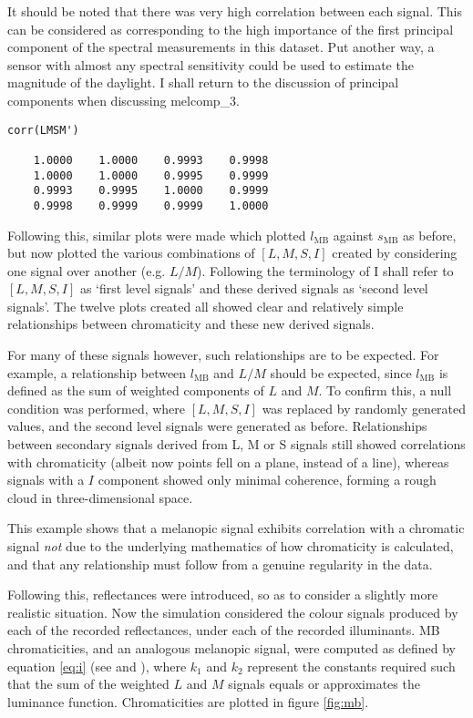 \documentclass{article}
\begin{document}
It should be noted that there was very high correlation between each signal. This can be considered as corresponding to the high importance of the first principal component of the spectral measurements in this dataset. Put another way, a sensor with almost any spectral sensitivity could be used to estimate the magnitude of the daylight. I shall return to the discussion of principal components when discussing melcomp\_3.

\begin{minipage}{\linewidth}
\begin{lstlisting}
corr(LMSM')

    1.0000    1.0000    0.9993    0.9998
    1.0000    1.0000    0.9995    0.9999
    0.9993    0.9995    1.0000    0.9999
    0.9998    0.9999    0.9999    1.0000
\end{lstlisting}
\end{minipage}

Following this, similar plots were made which plotted $l_{\text{MB}}$ against $s_{\text{MB}}$ as before, but now plotted the various combinations of $[L,M,S,I]$ created by considering one signal over another (e.g. $L/M$). Following the terminology of \cite{barrionuevo_contributions_2014} I shall refer to $[L,M,S,I]$ as `first level signals' and these derived signals as `second level signals'. The twelve plots created all showed clear and relatively simple relationships between chromaticity and these new derived signals.

For many of these signals however, such relationships are to be expected. For example, a relationship between $l_{\text{MB}}$ and $L/M$ should be expected, since $l_{\text{MB}}$ is defined as the sum of weighted components of $L$ and $M$. To confirm this, a null condition was performed, where $[L,M,S,I]$ was replaced by randomly generated values, and the second level signals were generated as before. Relationships between secondary signals derived from L, M or S signals still showed correlations with chromaticity (albeit now points fell on a plane, instead of a line), whereas signals with a $I$ component showed only minimal coherence, forming a rough cloud in three-dimensional space. 

This example shows that a melanopic signal exhibits correlation with a chromatic signal \emph{not} due to the underlying mathematics of how chromaticity is calculated, and that any relationship must follow from a genuine regularity in the data.

Following this, reflectances were introduced, so as to consider a slightly more realistic situation. Now the simulation considered the colour signals produced by each of the recorded reflectances, under each of the recorded illuminants. \ac{MB} chromaticities, and an analogous melanopic signal, were computed as defined by equation \ref{eq:i} (see \cite{macleod_chromaticity_1979} and \cite{cie_cie_2015}), where $k_1$ and $k_2$ represent the constants required such that the sum of the weighted $L$ and $M$ signals equals or approximates the luminance function. Chromaticities are plotted in figure \ref{fig:mb}.
\end{document}
